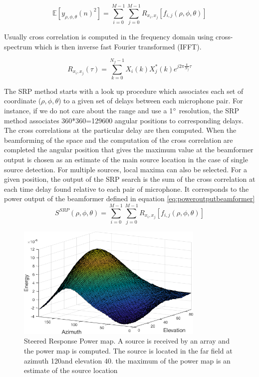 \begin{equation}
    \mathbb{E}[{y_{\rho,\phi,\theta}(n)^2}]=\sum\limits_{i=0}^{M-1}\sum\limits_{j=0}^{M-1}{R_{x_i,x_j}[f_{i,j}(\rho,\phi,\theta)]} 
    \label{eq:poweroutputbeamformer}
\end{equation}

Usually cross correlation is computed in the frequency domain using cross-spectrum which is then inverse fast Fourier transformed (IFFT).

\begin{equation}
    R_{x_i,x_j}(\tau)= \sum\limits_{k=0}^{N_{f}-1}{X_{i}(k)X_{j}^*(k)e^{j2\pi\frac{k}{N_{f}}\tau}}
\end{equation}


The SRP method starts with a look up procedure which associates each set of coordinate ($\rho,\phi,\theta$) to a given set of delays between each microphone pair. For instance, if we do not care about the range and use a 1$\degree$  resolution, the SRP method associates 360*360=129600 angular positions to corresponding delays. The cross correlations at the particular delay are then computed. When the beamforming of the space and the computation of the cross correlation are completed the angular position that gives the maximum value at the beamformer output is chosen as an estimate of the main source location in the case of single source detection. For multiple sources, local maxima can also be selected. For a given position, the output of the SRP search is the sum of the cross correlation at each time delay found relative to each pair of microphone. It corresponds to the power output of the beamformer defined in equation \ref{eq:poweroutputbeamformer}
\begin{equation}
    S^{SRP}(\rho,\phi,\theta)=\sum\limits_{i=0}^{M-1}\sum\limits_{j=0}^{M-1}{R_{x_i,x_j}[f_{i,j}(\rho,\phi,\theta)]}
\end{equation}

\begin{figure}[H]
    \centering
    \includegraphics[width=0.8\textwidth]{Figures/searchmapexample.png}
    \caption{Steered Response Power map. A source is received by an array and the power map is computed. The source is located in the far field at azimuth 120\degree and elevation 40\degree. the maximum of the power map is an estimate of the source location}
    \label{fig:srpmapexample}
\end{figure}

